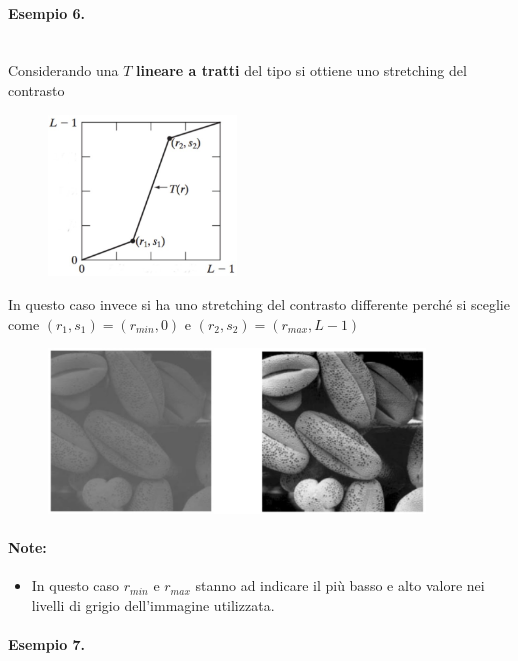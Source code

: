 \paragraph{Esempio 6.}\ \\

Considerando una $T$ \textbf{lineare a tratti} del tipo si ottiene uno
stretching del contrasto

\begin{figure}[H]
    \centering
    \includegraphics[width=5cm, keepaspectratio]{capitoli/immagini/imgs/lineare_a_tratti_esempio_6.jpg}
\end{figure}

In questo caso invece si ha uno stretching del contrasto differente perché si
sceglie come $(r_1, s_1) = (r_{min}, 0)$ e $(r_2, s_2) = (r_{max} , L - 1)$

\begin{figure}[H]
    \centering
    \includegraphics[width=10cm, keepaspectratio]{capitoli/immagini/imgs/globuli_rossi.jpg}
\end{figure}

\paragraph{Note:}
\begin{itemize}
    \item In questo caso $r_{min}$ e $r_{max}$ stanno ad indicare il più basso e alto valore
          nei livelli di grigio dell'immagine utilizzata.
\end{itemize}

\paragraph{Esempio 7.}\ \\

